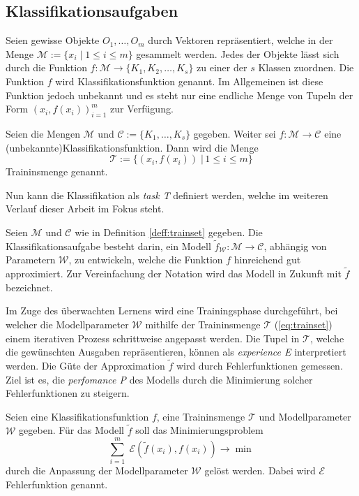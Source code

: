 \subsection{Klassifikationsaufgaben}
\label{abs:classtask}
Seien gewisse Objekte $O_1, \ldots, O_m$ durch Vektoren repräsentiert, welche in der Menge $\mathcal{M}:=\{x_i \; | \; 1 \leq i \leq m \}$ gesammelt werden. Jedes der Objekte lässt sich durch die Funktion $f:\mathcal{M} \rightarrow \{K_1, K_2, \ldots, K_s\}$ zu einer der $s$ Klassen zuordnen. Die Funktion $f$ wird Klassifikationsfunktion genannt. Im Allgemeinen ist diese Funktion jedoch unbekannt und es steht nur eine endliche Menge von Tupeln der Form $(x_i, f(x_i))_{i=1}^m$ zur Verfügung. 
\begin{defi}[Traininsmenge]
    \label{deff:trainset}
    Seien die Mengen $\mathcal{M}$ und $\mathcal{C}:=\{K_1, \ldots, K_s \}$ gegeben. Weiter sei $f: \mathcal{M} \rightarrow \mathcal{C}$ eine (unbekannte)Klassifikationsfunktion. Dann wird die Menge 
    \begin{equation}
        \label{eq:trainset}
        \mathcal{T}:=\{(x_i, f(x_i))\; | \, 1 \leq i \leq m\}
    \end{equation} Traininsmenge genannt. 
\end{defi}
Nun kann die Klassifikation als \textit{task T} definiert werden, welche im weiteren Verlauf dieser Arbeit im Fokus steht.
\begin{defi}[Klassifikationsaufgabe]
    Seien $\mathcal{M}$ und $\mathcal{C}$ wie in Definition \ref{deff:trainset} gegeben. Die Klassifikationsaufgabe besteht darin, ein Modell $\tilde{f}_{\mathcal{W}}:\mathcal{M} \rightarrow \mathcal{C}$, abhängig von Parametern $\mathcal{W}$, zu entwickeln, welche die Funktion $f$ hinreichend gut approximiert. Zur Vereinfachung der Notation wird das Modell in Zukunft mit $\tilde{f}$ bezeichnet.
\end{defi}
Im Zuge des überwachten Lernens wird eine Trainingsphase durchgeführt, bei welcher die Modellparameter $\mathcal{W}$ mithilfe der Traininsmenge $\mathcal{T}$ (\ref{eq:trainset}) einem iterativen Prozess schrittweise angepasst werden. Die Tupel in $\mathcal{T}$, welche die gewünschten Ausgaben repräsentieren, können als \textit{experience E} interpretiert werden.
Die Güte der Approximation $\tilde{f}$ wird durch Fehlerfunktionen gemessen. Ziel ist es, die \textit{perfomance P} des Modells durch die Minimierung solcher Fehlerfunktionen zu steigern.  
\begin{defi}
    Seien eine Klassifikationsfunktion $f$, eine Traininsmenge $\mathcal{T}$ und Modellparameter $\mathcal{W}$ gegeben. Für das Modell $\tilde{f}$ soll das Minimierungsproblem 
    \begin{equation}
        \label{eq:opt_fund_abs}
        \sum_{i=1}^m \; \mathcal{E}(\tilde{f}(x_i),f(x_i)) \rightarrow \min
    \end{equation}
    durch die Anpassung der Modellparameter $\mathcal{W}$ gelöst werden. Dabei wird $\mathcal{E}$ Fehlerfunktion genannt.
\end{defi}

